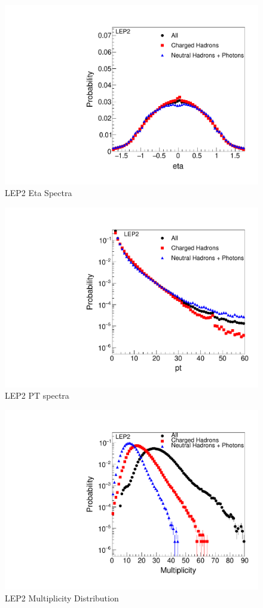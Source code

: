 \begin{figure}[!htb]
\begin{center}
\includegraphics[width=.45\textwidth]{images/DataQualityCheck/LEP2_eta.pdf}
\caption{LEP2 Eta Spectra}
\label{fig:figure4} 
\end{center}
\end{figure}

\begin{figure}[!htb]
\begin{center}
\includegraphics[width=.45\textwidth]{images/DataQualityCheck/LEP2_pt.pdf}
\caption{LEP2 PT spectra}
\label{fig:figure5} 
\end{center}
\end{figure}

\begin{figure}[!htb]
\begin{center}
\includegraphics[width=.45\textwidth]{images/DataQualityCheck/LEP2_mult.pdf}
\caption{LEP2 Multiplicity Distribution}
\label{fig:figure6} 
\end{center}
\end{figure}

